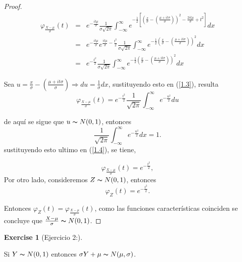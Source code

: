 \documentclass[
  letterpaper,
  DIV=11,
  numbers=noendperiod]{scrreprt}
\theoremstyle{definition}
\newtheorem{exercise}{Exercise}[chapter]
\theoremstyle{plain}
\theoremstyle{remark}
\begin{document}
\begin{proof}
\begin{eqnarray}\label{1.3}
\varphi_{\frac{X-\mu}{\sigma}}(t) & = & e^{-\frac{it\mu}{\sigma}}\frac{1}{\sigma\sqrt{2\pi}}\int_{-\infty}^{\infty}e^{-\frac{1}{2}\left[\left(\frac{x}{\sigma}-\left(\frac{\mu+it\sigma}{\sigma}\right)\right)^{2}-\frac{2 it\mu}{\sigma}+t^{2}\right]}dx\nonumber\\
& = & e^{-\frac{it\mu}{\sigma}}e^{\frac{it\mu}{\sigma}-\frac{t^{2}}{2}}\frac{1}{\sigma\sqrt{2\pi}}\int_{-\infty}^{\infty}e^{-\frac{1}{2}\left(\frac{x}{\sigma}-\left(\frac{\mu+it\sigma}{\sigma}\right)\right)^{2}}dx\nonumber\\
& = & e^{-\frac{t^{2}}{2}}\frac{1}{\sigma\sqrt{2\pi}}\int_{-\infty}^{\infty}e^{-\frac{1}{2}\left(\frac{x}{\sigma}-\left(\frac{\mu+it\sigma}{\sigma}\right)\right)^{2}}dx
\end{eqnarray}

Sea
\(u=\frac{x}{\sigma}-\left(\frac{\mu+it\sigma}{\sigma}\right)\Longrightarrow du=\frac{1}{\sigma}dx\),
sustituyendo esto en (\ref{1.3}), resulta \begin{equation}\label{1.4}
\varphi_{\frac{X-\mu}{\sigma}}(t) = e^{-\frac{t^{2}}{2}}\frac{1}{\sqrt{2\pi}}\int_{-\infty}^{\infty}e^{-\frac{u^{2}}{2}}du
\end{equation}

de aquí se sigue que \(u\thicksim N(0,1)\), entonces \[
\frac{1}{\sqrt{2\pi}}\int_{-\infty}^{\infty}e^{-\frac{u^{2}}{2}}dx=1.
\] sustituyendo esto ultimo en (\ref{1.4}), se tiene,

\begin{equation}\label{1.5}
\varphi_{\frac{X-\mu}{\sigma}}(t) =e^{-\frac{t^{2}}{2}},
\end{equation} Por otro lado, consideremos \(Z\thicksim N(0,1)\),
entonces \begin{equation*}
\varphi_{Z}(t) =e^{-\frac{t^{2}}{2}}.
\end{equation*}

Entonces \(\varphi_{Z}(t)=\varphi_{\frac{X-\mu}{\sigma}}(t)\), como las
funciones características coinciden se concluye que
\(\frac{X-\mu}{\sigma}\thicksim N(0,1)\).

\end{proof}

\begin{exercise}[Ejercicio 2:]\protect\hypertarget{exr-2}{}\label{exr-2}

Si \(Y\thicksim N(0,1)\) entonces
\(\sigma Y+\mu \thicksim N(\mu,\sigma)\).

\end{exercise}
\end{document}
